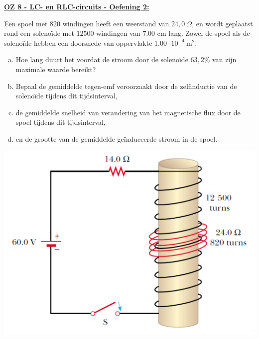 \textbf{\underline{OZ 8 - LC- en  RLC-circuits - Oefening 2:}}
\vspace{0.5cm}

Een spoel met $820$ windingen heeft een weerstand van $24,0 \ \Omega$, en wordt geplaatst rond een solenoïde met $12500$ windingen van $7.00$ cm lang. Zowel de spoel als de solenoïde hebben een doorsnede van oppervlakte $1.00\cdot10^{-4} \ \text{m}^2$.

\vspace{0.3cm}
\begin{minipage}{.66\textwidth}
    \begin{enumerate}[(a)]
        \item 
            Hoe lang duurt het voordat de stroom door de solenoïde $63,2\%$ van zijn maximale waarde bereikt?
        \item 
            Bepaal de gemiddelde tegen-emf veroorzaakt door de zelfinductie van de solenoïde tijdens dit tijdsinterval,
        \item 
            de gemiddelde snelheid van verandering van het magnetische flux door de spoel tijdens dit tijdsinterval,
        \item 
            en de grootte van de gemiddelde geïnduceerde stroom in de spoel.
    \end{enumerate}
\end{minipage}
\begin{minipage}{.3\textwidth}
    \includegraphics[scale = 0.3]{oz08/resources/Oz8Oef2.png}
\end{minipage}


